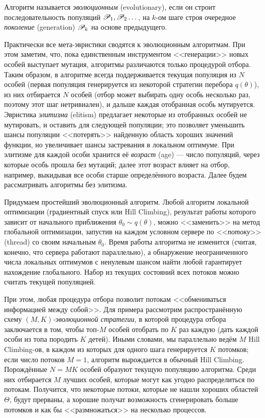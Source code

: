 \begin{definition}
Алгоритм называется \emph{эволюционным} (evolutionary), если он строит последовательность популяций $\mathscr{P}_1, \mathscr{P}_2 \dots$, на $k$-ом шаге строя очередное \emph{поколение} (generation) $\mathscr{P}_k$ на основе предыдущего.
\end{definition}

Практически все мета-эвристики сводятся к эволюционным алгоритмам. При этом заметим, что, пока единственным инструментом <<генерации>> новых особей выступает мутация, алгоритмы различаются только процедурой отбора. Таким образом, в алгоритме всегда поддерживается текущая популяция из $N$ особей (первая популяция генерируется из некоторой стратегии перебора $q(\theta)$), из них отбирается $N$ особей (отбор может выбирать одну особь несколько раз, поэтому этот шаг нетривиален), и дальше каждая отобранная особь мутируется. Эвристика \emph{элитизма} (elitism) предлагает некоторые из отобранных особей не мутировать, и оставить для следующей популяции; это позволяет уменьшить шансы популяции <<потерять>> найденную область хороших значений функции, но увеличивает шансы застревания в локальном оптимуме. При элитизме для каждой особи хранится её \emph{возраст} (age) --- число популяций, через которые особь прошла без мутаций; далее этот возраст влияет на отбор, например, выкидывая все особи старше определённого возраста. Далее будем рассматривать алгоритмы без элитизма.

Придумаем простейший эволюционный алгоритм. Любой алгоритм локальной оптимизации (градиентный спуск или Hill Climbing), результат работы которого зависит от начального приближения $\theta_0 \sim q(\theta)$, можно <<заменить>> на метод глобальной оптимизации, запустив на каждом условном сервере по <<\emph{потоку}>> (thread) со своим начальным $\theta_0$. Время работы алгоритма не изменится (считая, конечно, что сервера работают параллельно), а обнаружение неограниченного числа локальных оптимумов с ненулевым шансом найти любой гарантирует нахождение глобального. Набор из текущих состояний всех потоков можно считать текущей популяцией.

При этом, любая процедура отбора позволит потокам <<обмениваться информацией между собой>>. Для примера рассмотрим распространённую схему \emph{$(M, K)$-эволюционной стратегии}, в которой процедура отбора заключается в том, чтобы топ-$M$ особей отобрать по $K$ раз каждую (дать каждой особи из топа породить $K$ детей). Иными словами, мы параллельно ведём $M$ Hill Climbing-ов, в каждом из которых для одного шага генерируется $K$ потомков; если число потоков $M = 1$, алгоритм вырождается в обычный Hill Climbing. Порождённые $N = MK$ особей образуют текущую популяцию алгоритма. Среди них отбирается $M$ лучших особей, которые могут как угодно распределиться по потокам. Получится, что некоторые потоки, которые не нашли хороших областей $\Theta$, будут прерваны, а хорошие получат возможность сгенерировать больше потомков и как бы <<размножаться>> на несколько процессов. 

